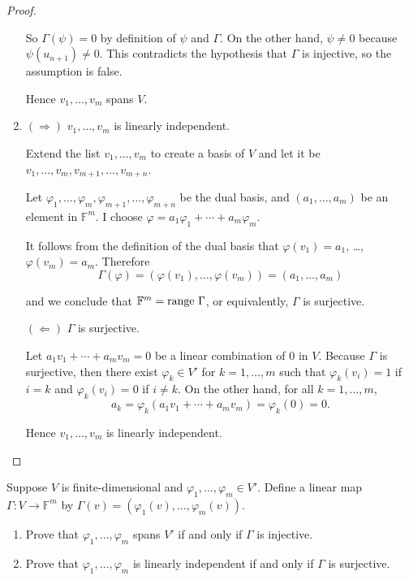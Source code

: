 \begin{proof}
\begin{enumerate}[label={(\alph*)}]
              So $\Gamma(\psi) = 0$ by definition of $\psi$ and $\Gamma$. On the other hand, $\psi\ne 0$ because $\psi(u_{n+1})\ne 0$. This contradicts the hypothesis that $\Gamma$ is injective, so the assumption is false.

              Hence $v_{1}, \ldots, v_{m}$ spans $V$.
        \item $(\Rightarrow)$ $v_{1}, \ldots, v_{m}$ is linearly independent.

              Extend the list $v_{1}, \ldots, v_{m}$ to create a basis of $V$ and let it be $v_{1}, \ldots, v_{m}, v_{m+1},\ldots, v_{m+n}$.

              Let $\varphi_{1}, \ldots, \varphi_{m}, \varphi_{m+1}, \ldots, \varphi_{m+n}$ be the dual basis, and $(a_{1}, \ldots, a_{m})$ be an element in $\mathbb{F}^{m}$. I choose $\varphi = a_{1}\varphi_{1} + \cdots + a_{m}\varphi_{m}$.

              It follows from the definition of the dual basis that $\varphi(v_{1}) = a_{1}$, \ldots, $\varphi(v_{m}) = a_{m}$. Therefore
              \[
                  \Gamma(\varphi) = (\varphi(v_{1}), \ldots, \varphi(v_{m})) = (a_{1}, \ldots, a_{m})
              \]

              and we conclude that $\mathbb{F}^{m} = \operatorname{range}\,{\Gamma}$, or equivalently, $\Gamma$ is surjective.

              $(\Leftarrow)$ $\Gamma$ is surjective.

              Let $a_{1}v_{1} + \cdots + a_{m}v_{m} = 0$ be a linear combination of $0$ in $V$. Because $\Gamma$ is surjective, then there exist $\varphi_{k}\in V'$ for $k = 1,\ldots, m$ such that $\varphi_{k}(v_{i}) = 1$ if $i = k$ and $\varphi_{k}(v_{i}) = 0$ if $i\ne k$. On the other hand, for all $k = 1,\ldots, m$,
              \[
                  a_{k} = \varphi_{k}(a_{1}v_{1} + \cdots + a_{m}v_{m}) = \varphi_{k}(0) = 0.
              \]

              Hence $v_{1}, \ldots, v_{m}$ is linearly independent.\qedhere
    \end{enumerate}
\end{proof}
\newpage

\begin{exercise}
    Suppose $V$ is finite-dimensional and $\varphi_{1} , \ldots, \varphi_{m} \in V'$. Define a linear map $\Gamma: V\to \mathbb{F}^{m}$ by $\Gamma(v) = (\varphi_{1}(v), \ldots, \varphi_{m}(v))$.
    \begin{enumerate}[label={(\alph*)}]
        \item Prove that $\varphi_{1}, \ldots, \varphi_{m}$ spans $V'$ if and only if $\Gamma$ is injective.
        \item Prove that $\varphi_{1}, \ldots, \varphi_{m}$ is linearly independent if and only if $\Gamma$ is surjective.
    \end{enumerate}
\end{exercise}

